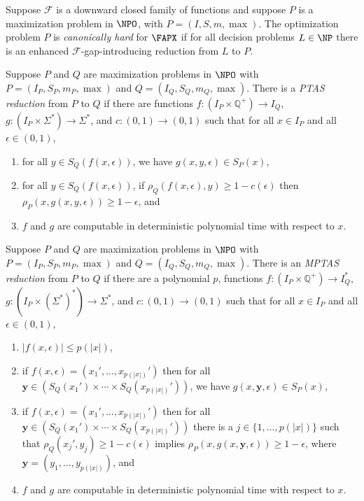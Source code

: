 \documentclass{article}
\begin{document}
\begin{definition}\label{def:canonicallyhard}
  Suppose $\mathcal{F}$ is a downward closed family of functions and suppose $P$ is a maximization problem in $\NPO$, with $P = (I, S, m, \max)$.
  The optimization problem $P$ is \emph{canonically hard} for $\FAPX$ if for all decision problems $L \in \NP$ there is an enhanced $\mathcal{F}$-gap-introducing reduction from $L$ to $P$.
\end{definition}

\begin{definition}\label{def:ptasreduction}
  Suppose $P$ and $Q$ are maximization problems in $\NPO$ with $P = (I_P, S_P, m_P, \max)$ and $Q = (I_Q, S_Q, m_Q, \max)$.
  There is a \emph{PTAS reduction} from $P$ to $Q$ if there are functions $f \colon \left(I_P \times \mathbb{Q}^+\right) \to I_Q$, $g \colon \left(I_P \times \Sigma^* \right) \to \Sigma^*$, and $c \colon (0, 1) \to (0, 1)$ such that for all $x \in I_P$ and all $\epsilon \in (0, 1)$,
  \begin{enumerate}
  \item for all $y \in S_Q(f(x, \epsilon))$, we have $g(x, y, \epsilon) \in S_P(x)$,
  \item for all $y \in S_Q(f(x, \epsilon))$, if $\rho_Q(f(x, \epsilon), y) \geq 1 - c(\epsilon)$ then $\rho_P(x, g(x, y, \epsilon)) \geq 1 - \epsilon$, and
  \item $f$ and $g$ are computable in deterministic polynomial time with respect to $x$.
  \end{enumerate}
\end{definition}

\begin{definition}\label{def:mptasreduction}
  Suppose $P$ and $Q$ are maximization problems in $\NPO$ with $P = (I_P, S_P, m_P, \max)$ and $Q = (I_Q, S_Q, m_Q, \max)$.
  There is an \emph{MPTAS reduction} from $P$ to $Q$ if there are a polynomial $p$, functions $f \colon \left(I_P \times \mathbb{Q}^+\right) \to I_Q^*$, $g \colon \left(I_P \times {\left(\Sigma^*\right)}^* \right) \to \Sigma^*$, and $c \colon (0, 1) \to (0, 1)$ such that for all $x \in I_P$ and all $\epsilon \in (0, 1)$,
  \begin{enumerate}
  \item $|f(x, \epsilon)| \leq p(|x|)$,
  \item if $f(x, \epsilon) = (x_1', \dotsc, x_{p(|x|)}')$ then for all $\mathbf{y} \in (S_Q(x_1') \times \dotsb \times S_Q(x_{p(|x|)}'))$, we have $g(x, \mathbf{y}, \epsilon) \in S_P(x)$,
  \item if $f(x, \epsilon) = (x_1', \dotsc, x_{p(|x|)}')$ then for all $\mathbf{y} \in (S_Q(x_1') \times \dotsb \times S_Q(x_{p(|x|)}'))$ there is a $j \in \{1, \dotsc, p(|x|)\}$ such that $\rho_Q(x_j', y_j) \geq 1 - c(\epsilon)$ implies $\rho_P(x, g(x, \mathbf{y}, \epsilon)) \geq 1 - \epsilon$, where $\mathbf{y} = (y_1, \dotsc, y_{p(|x|)})$, and
  \item $f$ and $g$ are computable in deterministic polynomial time with respect to $x$.
  \end{enumerate}
\end{definition}
\end{document}
